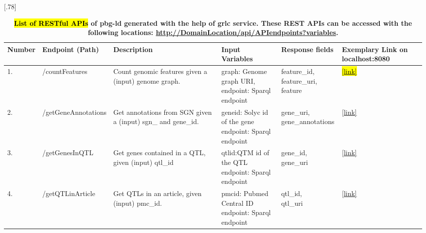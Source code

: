 \documentclass[applsci,article,accept,moreauthors,pdftex]{Definitions/mdpi}
\begin{document}
{\begin{table}[H]
\centering
\caption{\textbf{\hl{List of RESTful APIs} %
 of pbg-ld {generated} with the help of  grlc service. These REST APIs can be accessed with the following locations: \url{http://DomainLocation/api/APIendpoints?variables}.}}
\label{SP:Table1}
\scalebox{.78}[.78]{\begin{tabular}{m{1.2cm}<{\raggedright}m{3cm}<{\raggedright}m{3.5cm}<{\raggedright}m{4.5cm}<{\raggedright}m{3cm}<{\raggedright}m{1.8cm}<{\raggedright}}
\toprule
\textbf{Number} & \textbf{Endpoint (Path)} & \textbf{Description} & \textbf{Input Variables} & \textbf{Response fields} &  \textbf{Exemplary Link on localhost:8080}  \\
\midrule
1. & /countFeatures & Count genomic features given a (input) genome graph. & \makecell[l]{graph: Genome graph URI, \\
endpoint: Sparql endpoint} & \makecell[l]{feature{\_}id, \\  feature{\_}uri, \\ feature} &  \href{http://localhost:8080/api/candYgene/queries/countFeatures?graph=http://plants.ensembl.org/Solanum_lycopersicum}{\hl{[link]} %
}  \\ %

2.& /getGeneAnnotations & Get annotations from SGN given a (input) sgn{\_} and gene{\_}id. & \makecell[l]{geneid: Solyc id of the gene \\ endpoint: Sparql endpoint} &  \makecell[l]{gene{\_}uri, \\ gene{\_}annotations} &\href{http://localhost:8080/api/candYgene/queries/countFeatures?geneid=Solyc01g00500*}{[link]}  \\ %

3. & /getGenesInQTL & Get genes contained in a QTL, given (input) qtl{\_}id & \makecell[l] {qtlid:QTM id of the QTL \\ endpoint: Sparql endpoint} & gene{\_}id, gene{\_}uri & \href{http://localhost:8080/api/candYgene/queries/countFeatures?qtlid=QTL:3859326_3_2}{[link]}   \\ %

4. & /getQTLinArticle & Get QTLs in an article, given (input) pmc{\_}id.& \makecell[l]{ pmcid: Pubmed Central ID \\ endpoint: Sparql endpoint} & \makecell[l]{qtl{\_}id, \\ qtl{\_}uri}  & \href{http://localhost:8080/api/candYgene/queries/countFeatures?pmcid=PMC4321030}{[link]}  \\ %


\end{tabular}}
\end{table}}
\end{document}
